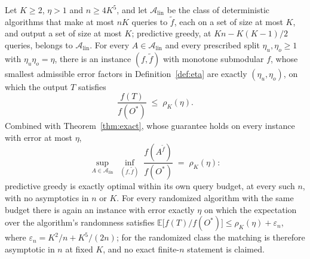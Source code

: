 \begin{theorem}
\label{thm:linear-exact}\label{cor:greedybudget}
Let $K\ge2$, $\eta>1$ and $n\ge4K^{5}$, and let $\mathcal A_{\mathrm{lin}}$
be the class of deterministic algorithms that make at most $nK$ queries to
$\tilde f$, each on a set of size at most $K$, and output a set of size at
most $K$; predictive greedy, at $Kn-K(K-1)/2$ queries, belongs to
$\mathcal A_{\mathrm{lin}}$.  For every $A\in\mathcal A_{\mathrm{lin}}$
and every prescribed split $\eta_u,\eta_o\ge1$ with $\eta_u\eta_o=\eta$,
there is an instance $(f,\tilde f)$ with monotone submodular $f$, whose
smallest admissible error factors in Definition~\ref{def:eta} are exactly
$(\eta_u,\eta_o)$, on which the output $T$ satisfies
\[
  \frac{f(T)}{f(O^{\ast})}\;\le\;\rho_K(\eta).
\]
Combined with Theorem~\ref{thm:exact}, whose guarantee holds on every
instance with error at most $\eta$,
\[
  \sup_{A\in\mathcal A_{\mathrm{lin}}}\;
  \inf_{(f,\tilde f)}\;
  \frac{f(A^{\tilde f})}{f(O^{\ast})}\;=\;\rho_K(\eta):
\]
predictive greedy is exactly optimal within its own query budget, at every
such $n$, with no asymptotics in $n$ or $K$.  For every randomized
algorithm with the same budget there is again an instance with error
exactly $\eta$ on which the expectation over the algorithm's randomness
satisfies
$\mathbb E\bigl[f(T)/f(O^{\ast})\bigr]\le\rho_K(\eta)+\varepsilon_n$, where
$\varepsilon_n=K^{2}/n+K^{5}/(2n)$; for the randomized class the matching
is therefore asymptotic in $n$ at fixed $K$, and no exact finite-$n$
statement is claimed.
\end{theorem}
